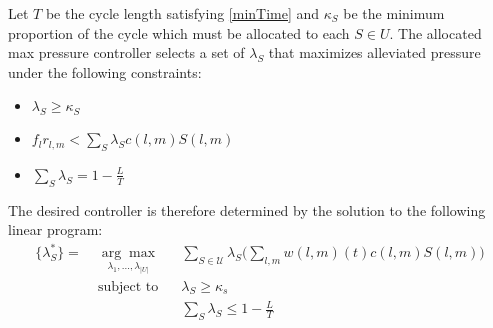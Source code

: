 Let $T$ be the cycle length satisfying \eqref{minTime} and $\kappa_S$ be the minimum proportion of the cycle which must be allocated to each $S\in U$. %
The allocated max pressure controller selects a set of $\lambda_S$ that maximizes alleviated pressure under the following constraints:
\begin{itemize}
\item $\lambda_{S} \geq \kappa_S$ 
\item $f_{l}r_{l,m} < \sum_{S}\lambda_{S} c(l,m)S(l,m)$
\item $ \sum_{S} \lambda_{S} = 1 - \frac{L}{T}$
\end{itemize}
The desired controller is therefore determined by the solution to the following linear program: 
\begin{align} \nonumber
\{ \lambda^*_S \} = \; & \underset{\lambda_{1},...,\lambda_{\vert U\vert}}{ \arg \max} & & \sum_{S \in \mathcal{U}}\lambda_{S}\Big(\sum_{l,m} w(l,m)(t)c(l,m) S(l,m)\Big)  \\
\nonumber & \text{subject to}
\nonumber & &  \lambda_{S} \geq \kappa_s\\
&&&\sum_{S} \lambda_{S} \leq 1 - \tfrac{L}{T}  \label{distMP_LP}
\end{align}
%
%
